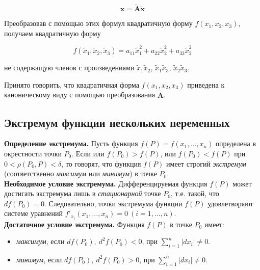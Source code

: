     \[
        \mathbf{x} = \tilde{\mathbf{A}} \tilde{\mathbf{x}}
    \]

    Преобразовав с помощью этих формул квадратичную форму $f \left( x_{1}, x_{2}, x_{3} \right)$, получаем квадратичную форму

    \[
        f \left( \tilde{x}_{1}, \tilde{x}_{2}, \tilde{x}_{3} \right) = a_{11} \tilde{x}^{2}_{1} + a_{22} \tilde{x}^{2}_{2} + a_{33} \tilde{x}^{2}_{2}
    \]

    не содержащую членов с произведениями $\tilde{x}_{1} \tilde{x}_{2}$, $\tilde{x}_{1} \tilde{x}_{3}$, $\tilde{x}_{2} \tilde{x}_{3}$.

    Принято говорить, что квадратичная форма $f \left( x_{1}, x_{2}, x_{3} \right)$ приведена к каноническому виду с помощью преобразования $\tilde{\mathbf{A}}$.

    \subsection{Экстремум функции нескольких переменных}

    \textbf{Определение экстремума.} Пусть функция $f \left( P \right) = f \left( x_{1}, \ldots, x_{n} \right)$ определена в окрестности точки $P_{0}$. Если или $f \left( P_{0} \right) > f \left( P \right)$, или $f \left( P_{0} \right) < f \left( P \right)$ при $0 < \rho \left( P_{0}, P \right) < \delta$, то говорят, что функция $f \left( P \right)$ имеет строгий \textit{экстремум} (соответственно \textit{максимум} или \textit{минимум}) в точке $P_{0}$.\\

    \textbf{Необходимое условие экстремума.} Дифференцируемая функция $f \left( P \right)$ может достигать экстремума лишь в \textit{стационарной} точке $P_{0}$, т.е. такой, что $d f \left( P_{0} \right) = 0$. Следовательно, точки экстремума функции $f \left( P \right)$ удовлетворяют системе уравнений $f'_{x_{i}} \left( x_{1}, \ldots, x_{n} \right) = 0 \: (i = 1, \ldots, n)$.\\

    \textbf{Достаточное условие экстремума.} Функция $f \left( P \right)$ в точке $P_{0}$ имеет:

    \begin{itemize}
    	\item \textit{максимум}, если $d f \left( P_{0} \right), \: d^{2} f \left( P_{0} \right) < 0$, при $\sum^{n}_{i = 1} \left| d x_{i} \right| \neq 0$.
    	\item \textit{минимум}, если $d f \left( P_{0} \right), \: d^{2} f \left( P_{0} \right) > 0$, при $\sum^{n}_{i = 1} \left| d x_{i} \right| \neq 0$.
    \end{itemize}

